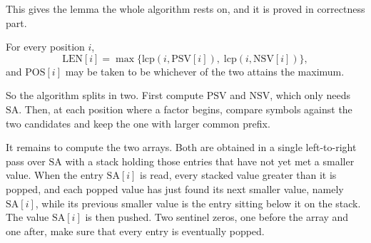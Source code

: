 \noindent This gives the lemma the whole algorithm rests on, and it is proved in correctness part.

\begin{lemma}
\label{lem:kkp-candidates}
    For every position \(i\),
    \[
        \mathrm{LEN}[i] = \max \{ \mathrm{lcp}(i, \mathrm{PSV}[i]),\; \mathrm{lcp}(i, \mathrm{NSV}[i]) \},
    \]
    and \(\mathrm{POS}[i]\) may be taken to be whichever of the two attains the maximum.
\end{lemma}

So the algorithm splits in two. First compute \(\mathrm{PSV}\) and \(\mathrm{NSV}\), which only needs \(\mathrm{SA}\). Then, at each position where a factor begins, compare symbols against the two candidates and keep the one with larger common prefix.

It remains to compute the two arrays. Both are obtained in a single left-to-right pass over \(\mathrm{SA}\) with a stack holding those entries that have not yet met a smaller value. When the entry \(\mathrm{SA}[i]\) is read, every stacked value greater than it is popped, and each popped value has just found its next smaller value, namely \(\mathrm{SA}[i]\), while its previous smaller value is the entry sitting below it on the stack. The value \(\mathrm{SA}[i]\) is then pushed. Two sentinel zeros, one before the array and one after, make sure that every entry is eventually popped.


